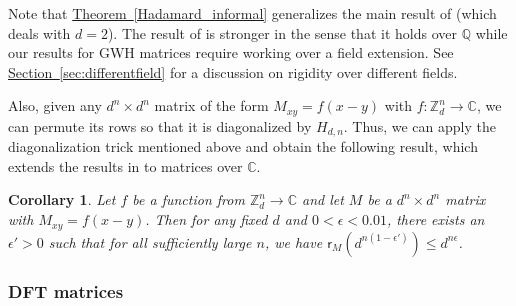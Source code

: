 \documentclass[11pt]{article}
\numberwithin{equation}{section}
\newtheorem{corollary}[theorem]{Corollary}
\theoremstyle{definition}
\theoremstyle{plain}
\newcommand{\C}{\mathbb C}
\newcommand{\Q}{\mathbb Q}
\newcommand{\Z}{\mathbb Z}
\newcommand{\expref}[2]{\hyperref[#2]{#1~\ref{#2}}}
\theoremstyle{definition}
\renewcommand\Q{{\mathbb{Q}}}
\renewcommand\Z{{\mathbb{Z}}}
\renewcommand\C{{\mathbb{C}}}
\begin{document}
Note that \expref{Theorem}{Hadamard_informal} generalizes the main result of \cite{old_hadamard}
%
%
(which deals with $d = 2$).   %
%
%
%
%
%
The result of \cite{old_hadamard} is stronger in the sense that it holds over $\Q$ while our results for GWH matrices require working over a field extension.  See \expref{Section}{sec:differentfield} for a
%
discussion on rigidity over different fields.
%

Also, given any $d^n \times d^n$ matrix of the form $M_{xy} = f(x - y)$ with  $f:\Z_d^n  \rightarrow \C$, we can permute its rows so that it is diagonalized by $H_{d,n}$.  Thus, we can apply the diagonalization trick mentioned above and obtain the following result, which extends
%
the results  %
in \cite{CLP} to matrices over $\C$.
\begin{corollary}\label{additive_informal}
Let $f$ be a function from $\Z_d^n \rightarrow \C$ and let $M$ be a $d^n \times d^n$ matrix with $M_{xy} = f(x - y)$.  Then for any fixed $d$ and $0 < \epsilon < 0.01$, there exists an $\epsilon' > 0$ such that for all sufficiently large $n$, %
we have %
$\textsf{r}_{M}\left( d^{n(1 - \epsilon')} \right) \leq d^{n\epsilon}$.
\end{corollary}

\subsubsection{DFT matrices} 
\end{document}
